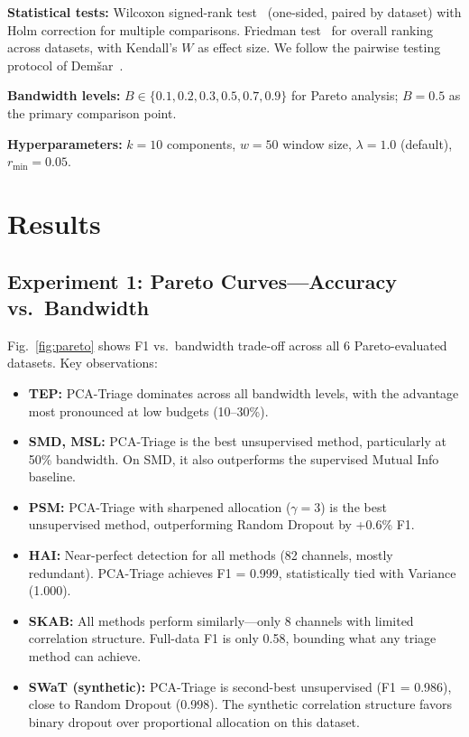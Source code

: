 \documentclass[journal]{IEEEtran}
\begin{document}
\textbf{Statistical tests:} Wilcoxon signed-rank test~\cite{wilcoxon1945individual} (one-sided, paired by dataset) with Holm correction for multiple comparisons. Friedman test~\cite{friedman1937comparison} for overall ranking across datasets, with Kendall's $W$ as effect size. We follow the pairwise testing protocol of Dem{\v{s}}ar~\cite{demsar2006statistical}.

\textbf{Bandwidth levels:} $B \in \{0.1, 0.2, 0.3, 0.5, 0.7, 0.9\}$ for Pareto analysis; $B = 0.5$ as the primary comparison point.

\textbf{Hyperparameters:} $k=10$ components, $w=50$ window size, $\lambda=1.0$ (default), $r_{\min} = 0.05$.

\section{Results}
\label{sec:results}

\subsection{Experiment 1: Pareto Curves---Accuracy vs.\ Bandwidth}

Fig.~\ref{fig:pareto} shows F1 vs.\ bandwidth trade-off across all 6 Pareto-evaluated datasets. Key observations:

\begin{itemize}[leftmargin=*]
\item \textbf{TEP:} PCA-Triage dominates across all bandwidth levels, with the advantage most pronounced at low budgets (10--30\%).
\item \textbf{SMD, MSL:} PCA-Triage is the best unsupervised method, particularly at 50\% bandwidth. On SMD, it also outperforms the supervised Mutual Info baseline.
\item \textbf{PSM:} PCA-Triage with sharpened allocation ($\gamma = 3$) is the best unsupervised method, outperforming Random Dropout by +0.6\% F1.
\item \textbf{HAI:} Near-perfect detection for all methods (82 channels, mostly redundant). PCA-Triage achieves F1 = 0.999, statistically tied with Variance (1.000).
\item \textbf{SKAB:} All methods perform similarly---only 8 channels with limited correlation structure. Full-data F1 is only 0.58, bounding what any triage method can achieve.
\item \textbf{SWaT (synthetic):} PCA-Triage is second-best unsupervised (F1 = 0.986), close to Random Dropout (0.998). The synthetic correlation structure favors binary dropout over proportional allocation on this dataset.
\end{itemize}
\end{document}
